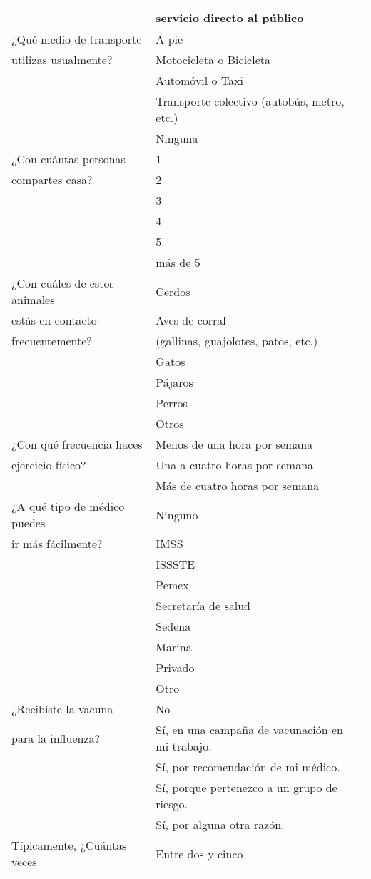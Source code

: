 \documentclass[letterpaper]{article}
\begin{document}
\begin{longtable}{|l|l|}
 & servicio directo al público \\ \hline 
¿Qué medio de transporte & A pie \\ 
 utilizas usualmente? & Motocicleta o Bicicleta \\ 
 & Automóvil o Taxi \\ 
 & Transporte colectivo (autobús, metro, etc.) \\ 
 & Ninguna \\ \hline 
¿Con cuántas personas & 1 \\ 
 compartes casa? & 2 \\ 
 & 3 \\ 
 & 4 \\ 
 & 5 \\ 
 & más de 5 \\ \hline 
\newpage
¿Con cuáles de estos animales & Cerdos \\ 
estás en contacto  & Aves de corral  \\ 
frecuentemente? & (gallinas, guajolotes, patos, etc.) \\
 & Gatos \\ 
 & Pájaros \\ 
 & Perros \\ 
 & Otros \\ \hline 
¿Con qué frecuencia haces & Menos de una hora por semana \\ 
 ejercicio físico? & Una a cuatro horas por semana \\ 
 & Más de cuatro horas por semana \\ \hline 
¿A qué tipo de médico puedes  & Ninguno \\ 
ir más fácilmente? & IMSS \\ 
 & ISSSTE \\ 
 & Pemex \\ 
 & Secretaría de salud \\ 
 & Sedena \\ 
 & Marina \\ 
 & Privado \\ 
 & Otro \\ \hline 
¿Recibiste la vacuna  & No \\ 
para la influenza? & Sí, en una campaña de vacunación en mi trabajo. \\ 
 & Sí, por recomendación de mi médico. \\ 
 & Sí, porque pertenezco a un grupo de riesgo. \\ 
 & Sí, por alguna otra razón. \\ \hline 
Típicamente, ¿Cuántas veces  & Entre dos y cinco \\ 

\end{longtable}
\end{document}
